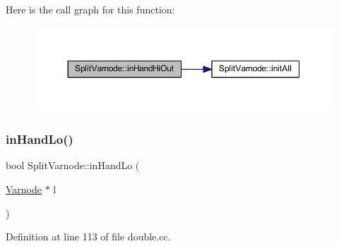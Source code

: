 Here is the call graph for this function\+:
\nopagebreak
\begin{figure}[H]
\begin{center}
\leavevmode
\includegraphics[width=350pt]{class_split_varnode_a5f0c6ee63f23f5ac06c6b38e805289ae_cgraph}
\end{center}
\end{figure}
\mbox{\label{class_split_varnode_a7be3658bd83eb37b531a5df3c2e0eb2c}} 
\subsubsection{\texorpdfstring{inHandLo()}{inHandLo()}}
{\footnotesize\ttfamily bool Split\+Varnode\+::in\+Hand\+Lo (\begin{DoxyParamCaption}\item[{\mbox{\hyperlink{class_varnode}{Varnode}} $\ast$}]{l }\end{DoxyParamCaption})}



Definition at line 113 of file double.\+cc.

